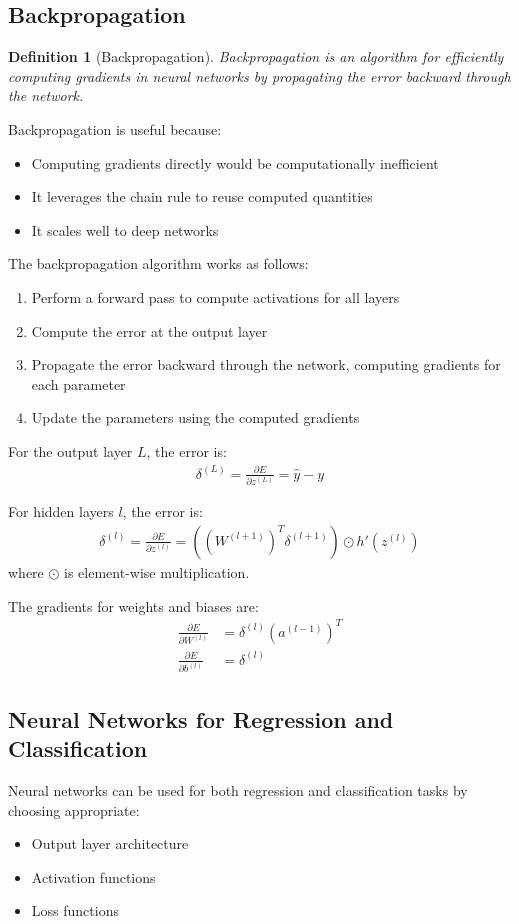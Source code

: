 \documentclass{article}
\newtheorem{definition}{Definition}
\begin{document}
\subsection{Backpropagation}
\begin{definition}[Backpropagation]
Backpropagation is an algorithm for efficiently computing gradients in neural networks by propagating the error backward through the network.
\end{definition}

Backpropagation is useful because:
\begin{itemize}
\item Computing gradients directly would be computationally inefficient
\item It leverages the chain rule to reuse computed quantities
\item It scales well to deep networks
\end{itemize}

The backpropagation algorithm works as follows:
\begin{enumerate}
\item Perform a forward pass to compute activations for all layers
\item Compute the error at the output layer
\item Propagate the error backward through the network, computing gradients for each parameter
\item Update the parameters using the computed gradients
\end{enumerate}

For the output layer $L$, the error is:
\begin{align}
\delta^{(L)} = \frac{\partial E}{\partial z^{(L)}} = \hat{y} - y
\end{align}

For hidden layers $l$, the error is:
\begin{align}
\delta^{(l)} = \frac{\partial E}{\partial z^{(l)}} = ((W^{(l+1)})^T\delta^{(l+1)}) \odot h'(z^{(l)})
\end{align}
where $\odot$ is element-wise multiplication.

The gradients for weights and biases are:
\begin{align}
\frac{\partial E}{\partial W^{(l)}} &= \delta^{(l)}(a^{(l-1)})^T\\
\frac{\partial E}{\partial b^{(l)}} &= \delta^{(l)}
\end{align}

\subsection{Neural Networks for Regression and Classification}
Neural networks can be used for both regression and classification tasks by choosing appropriate:
\begin{itemize}
\item Output layer architecture
\item Activation functions
\item Loss functions
\end{itemize}
\end{document}
